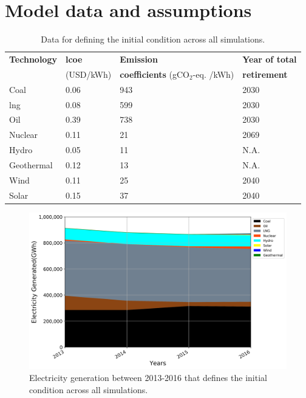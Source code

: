 \section{Model data and assumptions} \label{Appendix}

\begin{table}[H]
\centering
	\caption{Data for defining the initial condition across all simulations.}
	\vspace{0.1in}
	\begin{tabularx}{0.75\textwidth}{p{} p{} p{} p{}}
		\hline
\textbf{Technology} & \textbf{\gls{lcoe}} \cite{lazard_lazards_2016} & \textbf{Emission} & \textbf{Year of total}\\
  & (USD/kWh) & \textbf{coefficients} \cite{noauthor_electricity_2019} (gCO$_2$-eq. /kWh) & \textbf{retirement} \\
\hline
Coal & 0.06 & 943 & 2030 \\
\gls{lng} & 0.08 & 599 & 2030 \\
Oil & 0.39 & 738 & 2030 \\
Nuclear & 0.11 & 21 & 2069 \\
Hydro & 0.05 & 11 & N.A. \\
Geothermal & 0.12 & 13 & N.A. \\
Wind & 0.11 & 25 & 2040 \\
Solar & 0.15 & 37 & 2040 \\
\hline 
\end{tabularx}
\label{init-eco}
\end{table}

\begin{figure}[h] 
\centering
\label{ic-elc}
\includegraphics[scale=0.5]{figures/IC}
\caption{Electricity generation between 2013-2016 that defines the initial condition across all simulations.}
\end{figure}

